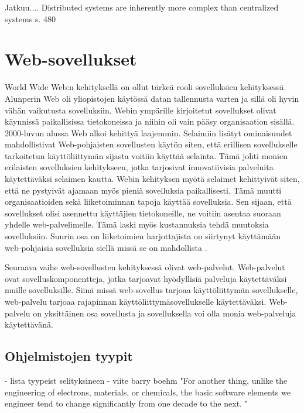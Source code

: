 \documentclass[utf8]{gradu3}
\begin{document}
Jatkuu.... Distributed systems are inherently more complex than centralized systems s. 480











\chapter{Web-sovellukset}
World Wide Web:n kehityksellä on ollut tärkeä rooli sovelluksien kehityksessä. Alunperin Web oli yliopistojen käytössä datan tallennusta varten ja sillä oli hyvin vähän vaikutusta sovelluksiin. Webin ympärille kirjoitetut sovellukset olivat käynnissä paikallisissa tietokoneissa ja niihin oli vain pääsy organisaation sisällä. 2000-luvun alussa Web alkoi kehittyä laajemmin. Selaimiin lisätyt ominaisuudet mahdollistivat Web-pohjaisten sovellusten käytön siten, että erillisen sovellukselle tarkoitetun käyttöliittymän sijasta voitiin käyttää selainta. Tämä johti monien erilaisten sovelluksien kehitykseen, jotka tarjosivat innovatiivisia palveluita käytettäväksi selaimen kautta. Webin kehityksen myötä selaimet kehittyivät siten, että ne pystyivät ajamaan myös pieniä sovelluksia paikallisesti. Tämä muutti organisaatioiden sekä liiketoiminnan tapoja käyttää sovelluksia. Sen sijaan, että sovellukset olisi asennettu käyttäjien tietokoneille, ne voitiin asentaa suoraan yhdelle web-palvelimelle. Tämä laski myös kustannuksia tehdä muutoksia sovelluksiin. Suurin osa on liiketoimien harjottajista on siirtynyt käyttämään web-pohjaisia sovelluksia siellä missä se on mahdollista \parencite[s.8]{Sommerville}.

Seuraava vaihe web-sovellusten kehityksessä olivat web-palvelut. Web-palvelut ovat sovelluskomponentteja, jotka tarjoavat hyödyllisiä palveluja käytettäväksi muille sovelluksille. Siinä missä web-sovellus tarjoaa käyttöliittymän sovellukselle, web-palvelu tarjoaa rajapinnan käyttöliittymäsovellukselle käytettäväksi. Web-palvelu on yksittäinen osa sovellusta ja sovelluksella voi olla monia web-palveluja käytettävänä. 


\section{Ohjelmistojen tyypit}
- lista tyypeist selityksineen
- viite barry boehm "For another thing, unlike the engineering of electrons, materials, or chemicals, the basic software elements we engineer tend to change significantly from one decade to the next. "
\end{document}
